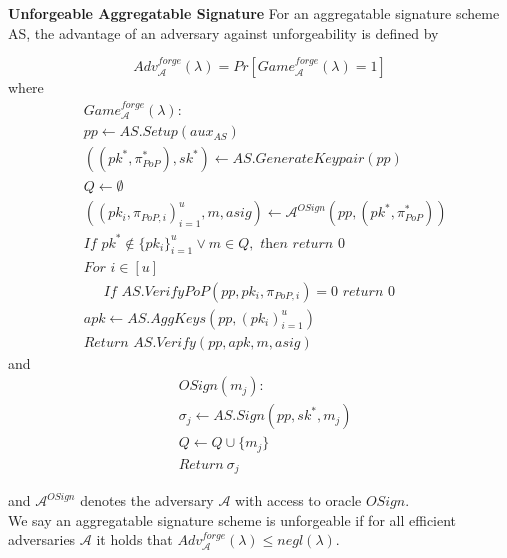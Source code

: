\begin{definition}
\noindent \textbf{Unforgeable Aggregatable Signature}
For an aggregatable signature scheme AS,
the advantage of an adversary against unforgeability is defined by

$$\mathit{Adv}^{\mathit{forge}}_{\mathcal{A}}({\lambda}) = \mathit{Pr}[\mathit{Game}^{\mathit{forge}}_{\mathcal{A}}({\lambda}) =1]$$
\noindent where
\begin{align*}
&\mathit{Game}^{\mathit{forge}}_{\mathcal{A}}({\lambda}): \\
& \mathit{pp} \leftarrow \mathit{AS.Setup}(\mathit{aux_{\mathit{AS}}}) \\
& ((\mathit{pk}^*,\pi^*_{\mathit{PoP}}), \mathit{sk}^*) \leftarrow \mathit{AS.GenerateKeypair}(\mathit{pp})\\
& Q \leftarrow \emptyset \\
& ((\mathit{pk_i}, \pi_{\mathit{PoP},i})_{i=1}^{u}, m, \mathit{asig}) \leftarrow \mathcal{A}^{\mathit{OSign}}(\mathit{pp}, (\mathit{pk^*},\pi^*_{\mathit{PoP}})) \\
& \textit{If } \mathit{pk}^* \notin \{\mathit{pk_i}\}_{i=1}^{u} \vee m \in Q, \textit{ then return } 0 \\
& \textit{For } i \in [u] \\
& \ \ \ \ \ \textit{ If } \mathit{AS.VerifyPoP}(\mathit{pp}, \mathit{pk_i}, \pi_{\mathit{PoP},i})=0  \textit{ return } 0 \\
& \mathit{apk} \leftarrow \mathit{AS.AggKeys}(\mathit{pp}, (\mathit{pk_i})_{i=1}^{u}) \\
& \textit{Return } \mathit{AS.Verify}(\mathit{pp}, \mathit{apk}, m, \mathit{asig})
\end{align*}
\noindent and
\begin{align*}
& \mathit{OSign}(m_j): \\
& \sigma_j \leftarrow \mathit{AS.Sign}(\mathit{pp}, \mathit{sk}^*, m_j) \\
&  Q \leftarrow Q \cup \{m_j\} \\
& \textit{Return} \ \sigma_j
\end{align*}

\noindent and $\mathcal{A}^{\mathit{OSign}}$ denotes the adversary $\mathcal{A}$ with access to oracle $\mathit{OSign}$. \\

\noindent We say an aggregatable signature scheme is unforgeable if for all efficient adversaries
$\mathcal{A}$ it holds that $\mathit{Adv}^{\mathit{forge}}_{\mathcal{A}}({\lambda}) \leq \mathit{negl}(\lambda)$. 
\end{definition}

